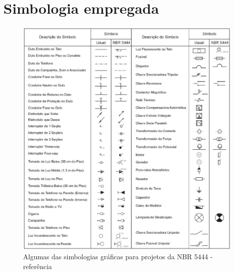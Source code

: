 \section{Simbologia empregada} \label{section: appendix A simbologia}

	\begin{figure}[H]
		\centering
		\includegraphics[width=\textwidth]{Figures/5. Symbology/NBR 5444.png}
		\caption{Algumas das simbologias gráficas para projetos da NBR 5444 - referência \cite{filho2017instalacoes}}
		\label{fig: simbologia nbr5444}
	\end{figure}